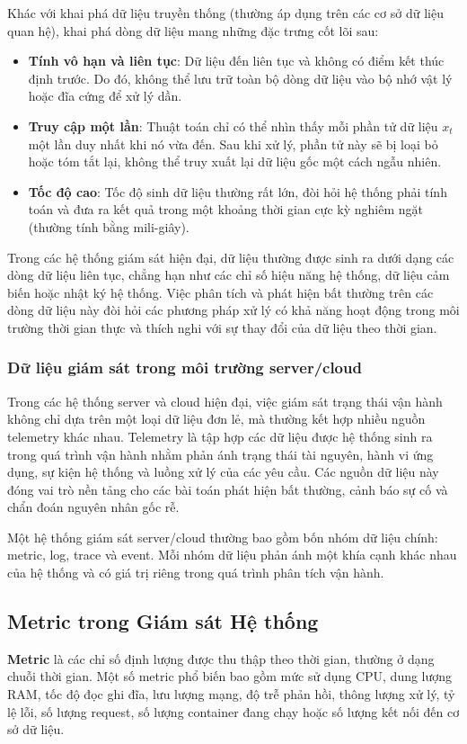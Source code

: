     Khác với khai phá dữ liệu truyền thống (thường áp dụng trên các cơ sở dữ liệu quan hệ), khai phá dòng dữ liệu mang những đặc trưng cốt lõi sau:
    \begin{itemize}[label=--]
        \item \textbf{Tính vô hạn và liên tục}: Dữ liệu đến liên tục và không có điểm kết thúc định trước. Do đó, không thể lưu trữ toàn bộ dòng dữ liệu vào bộ nhớ vật lý hoặc đĩa cứng để xử lý dần.
        \item \textbf{Truy cập một lần}: Thuật toán chỉ có thể nhìn thấy mỗi phần tử dữ liệu $x_t$ một lần duy nhất khi nó vừa đến. Sau khi xử lý, phần tử này sẽ bị loại bỏ hoặc tóm tắt lại, không thể truy xuất lại dữ liệu gốc một cách ngẫu nhiên.
        \item \textbf{Tốc độ cao}: Tốc độ sinh dữ liệu thường rất lớn, đòi hỏi hệ thống phải tính toán và đưa ra kết quả trong một khoảng thời gian cực kỳ nghiêm ngặt (thường tính bằng mili-giây).
    \end{itemize}
    Trong các hệ thống giám sát hiện đại, dữ liệu thường được sinh ra dưới dạng các dòng dữ liệu liên tục, chẳng hạn như các chỉ số hiệu năng hệ thống, dữ liệu cảm biến hoặc nhật ký hệ thống. Việc phân tích và phát hiện bất thường trên các dòng dữ liệu này đòi hỏi các phương pháp xử lý có khả năng hoạt động trong môi trường thời gian thực và thích nghi với sự thay đổi của dữ liệu theo thời gian.
\subsubsection{Dữ liệu giám sát trong môi trường server/cloud}

Trong các hệ thống server và cloud hiện đại, việc giám sát trạng thái vận hành không chỉ dựa trên một loại dữ liệu đơn lẻ, mà thường kết hợp nhiều nguồn telemetry khác nhau. Telemetry là tập hợp các dữ liệu được hệ thống sinh ra trong quá trình vận hành nhằm phản ánh trạng thái tài nguyên, hành vi ứng dụng, sự kiện hệ thống và luồng xử lý của các yêu cầu. Các nguồn dữ liệu này đóng vai trò nền tảng cho các bài toán phát hiện bất thường, cảnh báo sự cố và chẩn đoán nguyên nhân gốc rễ.

Một hệ thống giám sát server/cloud thường bao gồm bốn nhóm dữ liệu chính: metric, log, trace và event. Mỗi nhóm dữ liệu phản ánh một khía cạnh khác nhau của hệ thống và có giá trị riêng trong quá trình phân tích vận hành.
\subsection*{Metric trong Giám sát Hệ thống}
\textbf{Metric} là các chỉ số định lượng được thu thập theo thời gian, thường ở dạng chuỗi thời gian. Một số metric phổ biến bao gồm mức sử dụng CPU, dung lượng RAM, tốc độ đọc ghi đĩa, lưu lượng mạng, độ trễ phản hồi, thông lượng xử lý, tỷ lệ lỗi, số lượng request, số lượng container đang chạy hoặc số lượng kết nối đến cơ sở dữ liệu.

